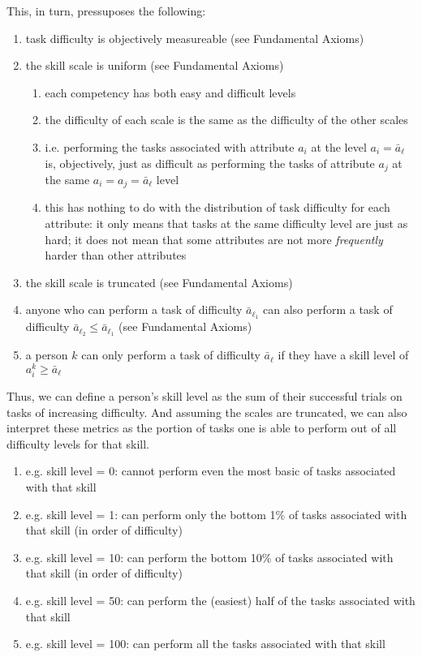 \documentclass{elsarticle} %
\begin{document}
This, in turn, pressuposes the following:
\begin{enumerate}
    \item task difficulty is objectively measureable (see Fundamental Axioms)
    \item the skill scale is uniform (see Fundamental Axioms)
    \begin{enumerate}
        \item each competency has both easy and difficult levels
        \item the difficulty of each scale is the same as the difficulty of the other scales
        \item i.e. performing the tasks associated with attribute $a_i$ at the level $a_i = \bar{a}_{\ell}$ is, objectively, just as difficult as performing the tasks of attribute $a_j$ at the same $a_i = a_j = \bar{a}_{\ell}$ level
        \item this has nothing to do with the distribution of task difficulty for each attribute: it only means that tasks at the same difficulty level are just as hard; it does not mean that some attributes are not more \textit{frequently} harder than other attributes
    \end{enumerate}
    \item the skill scale is truncated (see Fundamental Axioms)
    \item anyone who can perform a task of difficulty $\bar{a}_{\ell_1}$ can also perform a task of difficulty $\bar{a}_{\ell_2} \leq \bar{a}_{\ell_1}$ (see Fundamental Axioms)
    \item a person $k$ can only perform a task of difficulty $\bar{a}_{\ell}$ if they have a skill level of $a_{i}^{k} \geq \bar{a}_{\ell}$
\end{enumerate}

Thus, we can define a person's skill level as the sum of their successful trials on tasks of increasing difficulty. And assuming the scales are truncated, we can also interpret these metrics as the portion of tasks one is able to perform out of all difficulty levels for that skill.

\begin{enumerate}
    \item e.g. skill level = 0: cannot perform even the most basic of tasks associated with that skill
    \item e.g. skill level = 1: can perform only the bottom 1\% of tasks associated with that skill (in order of difficulty)
    \item e.g. skill level = 10: can perform the bottom 10\% of tasks associated with that skill (in order of difficulty)
    \item e.g. skill level = 50: can perform the (easiest) half of the tasks associated with that skill
    \item e.g. skill level = 100: can perform all the tasks associated with that skill
\end{enumerate}
\end{document}
